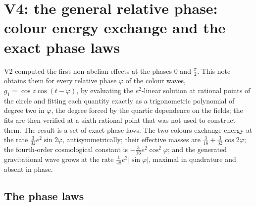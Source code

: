 \documentclass[11pt]{article}
\theoremstyle{remark}
\begin{document}
\section{V4: the general relative phase: colour energy exchange and the exact phase laws}
\label{sec:v20v4}

V2 computed the first non-abelian effects at the phases \(0\) and
\(\tfrac\pi2\).  This note obtains them for every relative phase
\(\varphi\) of the colour waves, \(g_1=\cos z\cos(t-\varphi)\), by
evaluating the \(e^2\)-linear solution at rational points of the
circle and fitting each quantity exactly as a trigonometric polynomial
of degree two in \(\varphi\), the degree forced by the quartic
dependence on the fields; the fits are then verified at a sixth
rational point that was not used to construct them.  The result is a
set of exact phase laws.  The two colours exchange energy at the rate
\(\tfrac3{32}e^2\sin2\varphi\), antisymmetrically; their effective
masses are \(\tfrac3{16}+\tfrac3{32}\cos2\varphi\); the fourth-order
cosmological constant is \(-\tfrac3{16}e^2\cos^2\varphi\); and the
generated gravitational wave grows at the rate \(\tfrac1{48}e^2|\sin\varphi|\),
maximal in quadrature and absent in phase.

\subsection{The phase laws}
\end{document}
